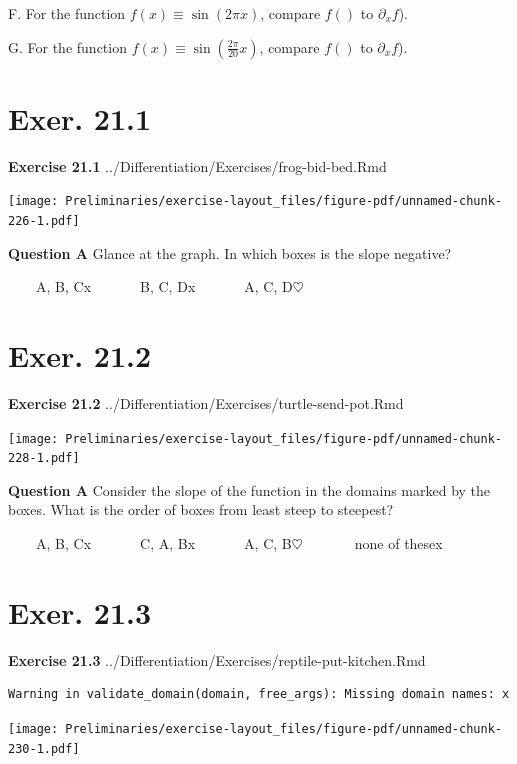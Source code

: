 \documentclass[
  letterpaper,
  DIV=11,
  numbers=noendperiod,
  oneside]{article}
\begin{document}
\begin{multicols}{2}
F. For the function \(f(x) \equiv \sin(2 \pi x)\), compare \(f()\) to
\(\partial_x f\)).

G. For the function \(f(x) \equiv \sin(\frac{2 \pi}{20} x)\), compare
\(f()\) to \(\partial_x f\)).

\hypertarget{exer.-21.1}{%
\section*{Exer. 21.1}\label{exer.-21.1}}

\textbf{Exercise 21.1} ../Differentiation/Exercises/frog-bid-bed.Rmd

\texttt{[image: Preliminaries/exercise-layout\_files/figure-pdf/unnamed-chunk-226-1.pdf]}

\textbf{Question A} Glance at the graph. In which boxes is the slope
negative?

~~~~{A, B, C{x}}~~~~~~~{B, C, D{x}}~~~~~~~{A, C,
D{\(\heartsuit\ \)}}

\hypertarget{exer.-21.2}{%
\section*{Exer. 21.2}\label{exer.-21.2}}

\textbf{Exercise 21.2} ../Differentiation/Exercises/turtle-send-pot.Rmd

\texttt{[image: Preliminaries/exercise-layout\_files/figure-pdf/unnamed-chunk-228-1.pdf]}

\textbf{Question A} Consider the slope of the function in the domains
marked by the boxes. What is the order of boxes from least steep to
steepest?

~~~~{A, B, C{x}}~~~~~~~{C, A, B{x}}~~~~~~~{A, C,
B{\(\heartsuit\ \)}}~~~~~~~{none of these{x}}

\hypertarget{exer.-21.3}{%
\section*{Exer. 21.3}\label{exer.-21.3}}

\textbf{Exercise 21.3}
../Differentiation/Exercises/reptile-put-kitchen.Rmd

\begin{verbatim}
Warning in validate_domain(domain, free_args): Missing domain names: x
\end{verbatim}

\texttt{[image: Preliminaries/exercise-layout\_files/figure-pdf/unnamed-chunk-230-1.pdf]}


\end{multicols}
\end{document}
